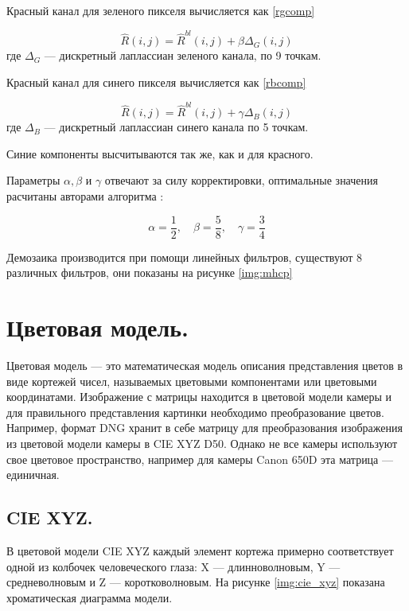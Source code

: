 Красный канал для зеленого пикселя вычисляется как \ref{rgcomp}

\begin{equation}
	\label{rgcomp}
	\hat{R}(i,j) = \hat{R}^{bl}(i,j) + \beta\Delta_{G}(i,j) 
\end{equation}
где $\Delta_{G}$ --- дискретный лаплассиан зеленого канала, по 9 точкам.

Красный канал для синего пикселя вычисляется как \ref{rbcomp}

\begin{equation}
	\label{rbcomp}
	\hat{R}(i,j) = \hat{R}^{bl}(i,j) + \gamma\Delta_{B}(i,j) 
\end{equation}
где $\Delta_{B}$ --- дискретный лаплассиан синего канала по 5 точкам.

Синие компоненты высчитываются так же, как и для красного.

Параметры $\alpha, \beta$ и $\gamma$ отвечают за силу корректировки, оптимальные значения расчитаны авторами алгоритма \cite{mhcd}:

\begin{equation}
	\alpha = \frac{1}{2}, \quad \beta = \frac{5}{8}, \quad \gamma = \frac{3}{4}
\end{equation}

Демозаика производится при помощи линейных фильтров, существуют 8 различных фильтров, они показаны на рисунке \ref{img:mhcp}

\newpage



\section{Цветовая модель.}
Цветовая модель --- это математическая модель описания представления цветов в виде кортежей чисел, называемых цветовыми компонентами или цветовыми координатами. Изображение с матрицы находится в цветовой модели камеры и для правильного представления картинки необходимо преобразование цветов. Например, формат DNG хранит в себе матрицу для преобразования изображения из цветовой модели камеры в CIE XYZ D50. Однако не все камеры используют свое цветовое пространство, например для камеры Canon 650D эта матрица --- единичная.

\subsection{CIE XYZ.}
В цветовой модели CIE XYZ каждый элемент кортежа примерно соответствует одной из колбочек человеческого глаза: X --- длинноволновым, Y --- средневолновым и Z --- коротковолновым. На рисунке \ref{img:cie_xyz} показана хроматическая диаграмма модели.

